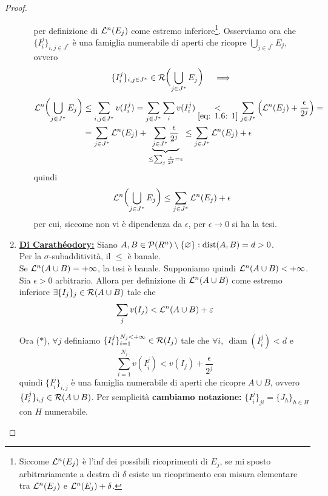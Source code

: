 \begin{proof}
\begin{enumerate}[label=\textbf{\Large\arabic*.}, ref=\textbf{\underline{(\arabic*)}}]
\begin{enumerate}[label=$\roman*)$]
            per definizione di $\mathcal{L}^n(E_j)$ come estremo inferiore\footnote{Siccome $\mathcal{L}^n(E_j)$ è l'inf dei possibili ricoprimenti di $E_j$, se mi sposto arbitrariamente a destra di $\delta$ esiste un ricoprimento con misura elementare tra $\mathcal{L}^n(E_j)$ e $\mathcal{L}^n(E_j)+\delta$.}. Osserviamo ora che $\{I^j_i\}_{i,j\in J^*}$ è una famiglia numerabile di aperti che ricopre $\bigcup_{j\in J^*}E_j$, ovvero \[\{I^j_i\}_{i,j\in J^*}\in \mathcal{R}\biggl(\bigcup_{j\in J^*}E_j\biggr)\quad \implies\]
            \[\begin{aligned}\mathcal{L}^n\biggl(\bigcup_{j\in J^*}E_j\biggr)&\leq \sum_{i,j\in J^*}v(I^j_i)= \sum_{j\in J^*}\sum_iv(I^j_i)\underset{\eqref{eq: 1.6: 1}}{<} \sum_{j\in J^*}\left( \mathcal{L}^n(E_j)+\frac{\epsilon}{2^j} \right) =\\&= \sum_{j\in J^*}\mathcal{L}^n(E_j)+\underbrace{\sum_{j\in J^*}\frac{\epsilon}{2^j}}_{\leq\sum_j\frac{\epsilon}{2^j}=\epsilon} \leq \sum_{j\in J^*}\mathcal{L}^n(E_j)+\epsilon\end{aligned}\] 
            quindi
            \[\mathcal{L}^n\biggl(\bigcup_{j\in J^*}E_j\biggr)\leq  \sum_{j\in J^*}\mathcal{L}^n(E_j)+\epsilon\] 
            per cui, siccome non vi è dipendenza da $\epsilon$, per $\epsilon\to 0$ si ha la tesi.
        \end{enumerate}
        \item \textbf{\underline{Di Carathéodory:}} Siano $A,B\in \mathcal{P}(R^n)\setminus \{\varnothing\} : \operatorname{dist}(A,B)=d>0$. \hspace{\fill}\\
        Per la $\sigma$-subadditività, il $\leq$ è banale. \hspace{\fill}\\
        Se $\mathcal{L}^n(A\cup B)=+\infty$, la tesi è banale. Supponiamo quindi $\mathcal{L}^n(A\cup B)<+\infty$. \\
        Sia $\epsilon >0$ arbitrario. Allora per definizione di $\mathcal{L}^n(A\cup B)$ come estremo inferiore $\exists \{I_j\}_j\in \mathcal{R}(A\cup B)$ tale che
        \begin{equation}\label{eq: 1.6: 2}\sum_jv(I_j)<\mathcal{L}^n(A\cup B)+\varepsilon\end{equation}

        Ora ($*$), $\forall j$ definiamo $\{I_i^j\}_{i=1}^{N_j<+\infty} \in \mathcal{R}(I_j)$ tale che $\forall i,\ \operatorname{diam}(I_i^j)<d$ e 
        \begin{equation}\label{eq: 1.6: 3}
            \sum_{i=1}^{N_j}v(I_i^j)<v(I_j)+\frac{\epsilon}{2^j}
        \end{equation}
        quindi $\{I_i^j\}_{i,j}$ è una famiglia numerabile di aperti che ricopre $A\cup B$, ovvero $\{I_i^j\}_{i,j}\in \mathcal{R}(A\cup B)$. Per semplicità \textbf{cambiamo notazione:} $\{I_i^j\}_{ji}=\{J_h\}_{h\in H}$ con $H$ numerabile.


\end{enumerate}
\end{proof}
